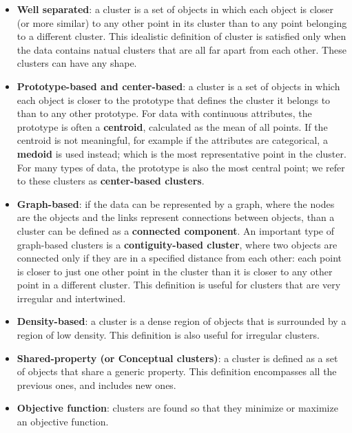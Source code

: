 \begin{itemize}
    \item \textbf{Well separated}: a cluster is a set of objects in which each object is closer (or more similar) to any other point in its cluster than to any point belonging to a different cluster. This idealistic definition of cluster is satisfied only when the data contains natual clusters that are all far apart from each other. These clusters can have any shape.

    \item \textbf{Prototype-based and center-based}: a cluster is a set of objects in which each object is closer to the prototype that defines the cluster it belongs to than to any other prototype. For data with continuous attributes, the prototype is often a \textbf{centroid}, calculated as the mean of all points. If the centroid is not meaningful, for example if the attributes are categorical, a \textbf{medoid} is used instead; which is the most representative point in the cluster. For many types of data, the prototype is also the most central point; we refer to these clusters as \textbf{center-based clusters}.

    \item \textbf{Graph-based}: if the data can be represented by a graph, where the nodes are the objects and the links represent connections between objects, than a cluster can be defined as a \textbf{connected component}. An important type of graph-based clusters is a \textbf{contiguity-based cluster}, where two objects are connected only if they are in a specified distance from each other: each point is closer to just one other point in the cluster than it is closer to any other point in a different cluster. This definition is useful for clusters that are very irregular and intertwined.
    
    \item \textbf{Density-based}: a cluster is a dense region of objects that is surrounded by a region of low density. This definition is also useful for irregular clusters.

    \item \textbf{Shared-property (or Conceptual clusters)}: a cluster is defined as a set of objects that share a generic property. This definition encompasses all the previous ones, and includes new ones.

    \item \textbf{Objective function}: clusters are found so that they minimize or maximize an objective function.
\end{itemize}


